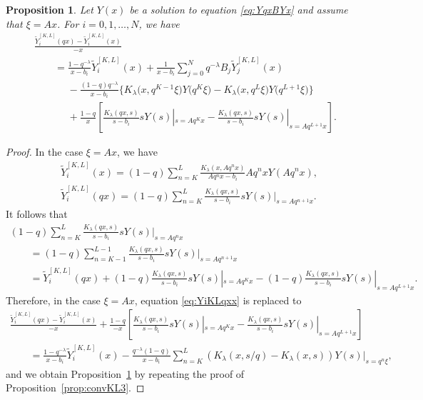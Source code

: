 \documentclass[pdftex]{sigma}
\numberwithin{equation}{section}
\newtheorem{Proposition}[Theorem]{Proposition}
\theoremstyle{definition}
\begin{document}
\begin{Proposition} \label{prop:convKL3xiAx}
Let $Y(x)$ be a solution to equation \eqref{eq:YqxBYx} and assume that $\xi =Ax$.
For $i=0,1,\dots ,N $, we have
\begin{gather*}
 \frac{\widetilde{Y}_{i}^{[K,L]}(qx) - \widetilde{Y}_{i}^{[K,L]}(x)}{-x}\\
 \qquad= \frac{1 - q^{-\lambda } }{x - b_{i}} \widetilde{Y}_{i}^{[K,L]}(x) + \frac{1}{x - b_{i}}\sum^{N}_{j = 0} q^{-\lambda } B_{j} \widetilde{Y}_{j}^{[K,L]}(x) \\
 \phantom{\qquad=}{} - \frac{(1-q) q^{-\lambda } }{x - b_{i}} \bigl\{ K_{\lambda}\bigl(x, q^{K-1} \xi\bigr)Y\bigl(q^{K} \xi\bigr) - K_{\lambda}\bigl(x, q^{L} \xi\bigr)Y\bigl(q^{L+1} \xi\bigr) \bigr\} \\
 \phantom{\qquad=}{} + \frac{1-q}{x} \left[ \frac{K_{\lambda}(qx, s) }{s-b_i} s Y(s) |_{s=A q^K x } - \frac{K_{\lambda}(qx, s) }{s-b_i} s Y(s) |_{s=A q^{L+1} x } \right].
\end{gather*}
\end{Proposition}
\begin{proof}
In the case $\xi =Ax$, we have
\begin{align*}
& \widetilde{Y}_{i}^{[K,L]}(x) = (1-q) \sum _{n=K}^{L} \frac{K_{\lambda}(x, A q^n x )}{A q^n x -b_{i}} A q^n x Y(A q^n x) , \\
& \widetilde{Y}_{i}^{[K,L]}(qx) = (1-q) \sum _{n=K}^{L} \frac{K_{\lambda}(qx, s)}{s-b_{i}} s Y(s) |_{s= A q^{n+1} x }.
\end{align*}
It follows that
\begin{gather*}
 (1-q) \sum _{n=K}^{L} \frac{K_{\lambda}(qx, s) }{s-b_i} s Y(s) |_{s=A q^n x }\\
 \qquad = (1-q) \sum _{n=K-1}^{L-1} \frac{K_{\lambda}(qx, s) }{s-b_i} s Y(s) |_{s=A q^{n+1} x } \\
\qquad = \widetilde{Y}_{i}^{[K,L]}(qx) + (1-q) \frac{K_{\lambda}(qx, s) }{s-b_i} s Y(s) |_{s=A q^K x } - (1-q) \frac{K_{\lambda}(qx, s) }{s-b_i} s Y(s) |_{s=A q^{L+1} x }.
\end{gather*}
Therefore, in the case $\xi =Ax$, equation \eqref{eq:YiKLqxx} is replaced to
\begin{gather*}
 \frac{\widetilde{Y}_{i}^{[K,L]}(qx) - \widetilde{Y}_{i}^{[K,L]}(x)}{-x} + \frac{1-q}{-x} \left[ \frac{K_{\lambda}(qx, s) }{s-b_i} s Y(s) |_{s=A q^K x } - \frac{K_{\lambda}(qx, s) }{s-b_i} s Y(s) |_{s=A q^{L+1} x } \right] \\
\qquad = \frac{ 1- q^{-\lambda } }{x - b_{i}} \widetilde{Y}_{i}^{[K,L]}(x) - \frac{ q^{-\lambda } (1-q) }{x - b_{i}}\sum _{n=K}^{L} (K_{\lambda}(x, s/q) - K_{\lambda}(x, s)) Y(s)|_{s= q^n \xi } ,
\end{gather*}
and we obtain Proposition~\ref{prop:convKL3xiAx} by repeating the proof of Proposition~\ref{prop:convKL3}.
\end{proof}
\end{document}
